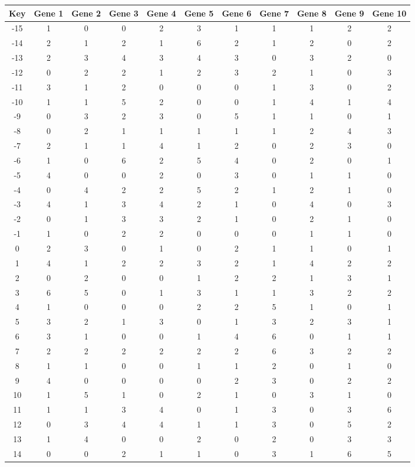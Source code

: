 \begin{tabular}{|c|c|c|c|c|c|c|c|c|c|c|}
\hline
Key & Gene 1 & Gene 2 & Gene 3 & Gene 4 & Gene 5 & Gene 6 & Gene 7 & Gene 8 & Gene 9 & Gene 10 \\
\hline
-15 & 1 & 0 & 0 & 2 & 3 & 1 & 1 & 1 & 2 & 2 \\
-14 & 2 & 1 & 2 & 1 & 6 & 2 & 1 & 2 & 0 & 2 \\
-13 & 2 & 3 & 4 & 3 & 4 & 3 & 0 & 3 & 2 & 0 \\
-12 & 0 & 2 & 2 & 1 & 2 & 3 & 2 & 1 & 0 & 3 \\
-11 & 3 & 1 & 2 & 0 & 0 & 0 & 1 & 3 & 0 & 2 \\
-10 & 1 & 1 & 5 & 2 & 0 & 0 & 1 & 4 & 1 & 4 \\
-9 & 0 & 3 & 2 & 3 & 0 & 5 & 1 & 1 & 0 & 1 \\
-8 & 0 & 2 & 1 & 1 & 1 & 1 & 1 & 2 & 4 & 3 \\
-7 & 2 & 1 & 1 & 4 & 1 & 2 & 0 & 2 & 3 & 0 \\
-6 & 1 & 0 & 6 & 2 & 5 & 4 & 0 & 2 & 0 & 1 \\
-5 & 4 & 0 & 0 & 2 & 0 & 3 & 0 & 1 & 1 & 0 \\
-4 & 0 & 4 & 2 & 2 & 5 & 2 & 1 & 2 & 1 & 0 \\
-3 & 4 & 1 & 3 & 4 & 2 & 1 & 0 & 4 & 0 & 3 \\
-2 & 0 & 1 & 3 & 3 & 2 & 1 & 0 & 2 & 1 & 0 \\
-1 & 1 & 0 & 2 & 2 & 0 & 0 & 0 & 1 & 1 & 0 \\
0 & 2 & 3 & 0 & 1 & 0 & 2 & 1 & 1 & 0 & 1 \\
1 & 4 & 1 & 2 & 2 & 3 & 2 & 1 & 4 & 2 & 2 \\
2 & 0 & 2 & 0 & 0 & 1 & 2 & 2 & 1 & 3 & 1 \\
3 & 6 & 5 & 0 & 1 & 3 & 1 & 1 & 3 & 2 & 2 \\
4 & 1 & 0 & 0 & 0 & 2 & 2 & 5 & 1 & 0 & 1 \\
5 & 3 & 2 & 1 & 3 & 0 & 1 & 3 & 2 & 3 & 1 \\
6 & 3 & 1 & 0 & 0 & 1 & 4 & 6 & 0 & 1 & 1 \\
7 & 2 & 2 & 2 & 2 & 2 & 2 & 6 & 3 & 2 & 2 \\
8 & 1 & 1 & 0 & 0 & 1 & 1 & 2 & 0 & 1 & 0 \\
9 & 4 & 0 & 0 & 0 & 0 & 2 & 3 & 0 & 2 & 2 \\
10 & 1 & 5 & 1 & 0 & 2 & 1 & 0 & 3 & 1 & 0 \\
11 & 1 & 1 & 3 & 4 & 0 & 1 & 3 & 0 & 3 & 6 \\
12 & 0 & 3 & 4 & 4 & 1 & 1 & 3 & 0 & 5 & 2 \\
13 & 1 & 4 & 0 & 0 & 2 & 0 & 2 & 0 & 3 & 3 \\
14 & 0 & 0 & 2 & 1 & 1 & 0 & 3 & 1 & 6 & 5 \\
\hline
\end{tabular}